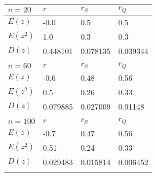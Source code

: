 \begin{tabular}{|l|l|l|l|}\hline $n=20$&$r$&$r_S$&$r_Q$  \\\hline$E(z)$&-0.0&0.5&0.5\\\hline$E(z^2)$&1.0&0.3&0.3\\\hline$D(z)$&0.448101&0.078135&0.039344\\\hline &  &  &  \\\hline $n=60$&$r$&$r_S$&$r_Q$  \\\hline$E(z)$&-0.6&0.48&0.56\\\hline$E(z^2)$&0.5&0.26&0.33\\\hline$D(z)$&0.079885&0.027009&0.01148\\\hline &  &  &  \\\hline $n=100$&$r$&$r_S$&$r_Q$  \\\hline$E(z)$&-0.7&0.47&0.56\\\hline$E(z^2)$&0.51&0.24&0.33\\\hline$D(z)$&0.029483&0.015814&0.006452\\\hline &  &  &  \\\hline \end{tabular}
